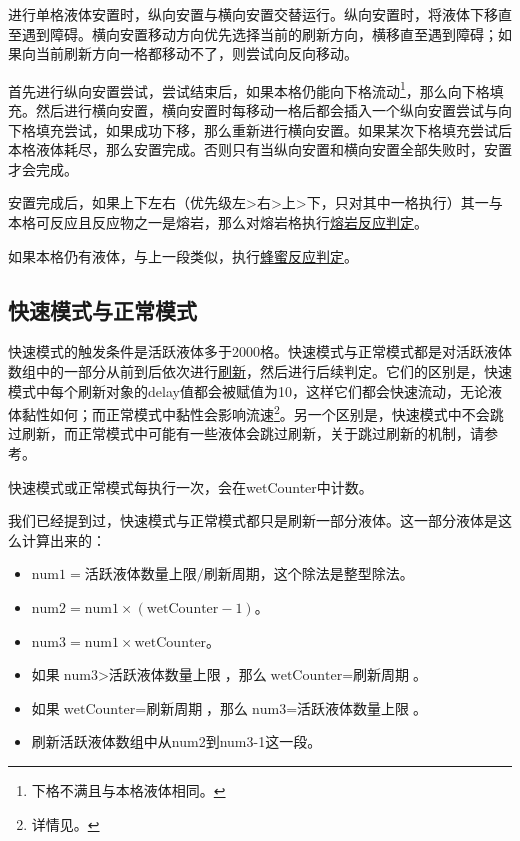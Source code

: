 进行单格液体安置时，纵向安置与横向安置交替运行。纵向安置时，将液体下移直至遇到障碍。横向安置移动方向优先选择当前的刷新方向，横移直至遇到障碍；如果向当前刷新方向一格都移动不了，则尝试向反向移动。

首先进行纵向安置尝试，尝试结束后，如果本格仍能向下格流动\footnote{下格不满且与本格液体相同。}，那么向下格填充。然后进行横向安置，横向安置时每移动一格后都会插入一个纵向安置尝试与向下格填充尝试，如果成功下移，那么重新进行横向安置。如果某次下格填充尝试后本格液体耗尽，那么安置完成。否则只有当纵向安置和横向安置全部失败时，安置才会完成。

安置完成后，如果上下左右（优先级左>右>上>下，只对其中一格执行）其一与本格可反应且反应物之一是熔岩，那么对熔岩格执行\hyperref[app24]{熔岩反应判定}。

如果本格仍有液体，与上一段类似，执行\hyperref[app25]{蜂蜜反应判定}。

\subsection{快速模式与正常模式}\label{app27}
快速模式的触发条件是活跃液体多于2000格。快速模式与正常模式都是对活跃液体数组中的一部分从前到后依次进行\hyperref[app26]{刷新}，然后进行后续判定。它们的区别是，快速模式中每个刷新对象的delay值都会被赋值为10，这样它们都会快速流动，无论液体黏性如何；而正常模式中黏性会影响流速\footnote{详情见。}。另一个区别是，快速模式中不会跳过刷新，而正常模式中可能有一些液体会跳过刷新，关于跳过刷新的机制，请参考。

快速模式或正常模式每执行一次，会在wetCounter中计数。

我们已经提到过，快速模式与正常模式都只是刷新一部分液体。这一部分液体是这么计算出来的：
\begin{itemize}
    \item $\textrm{num1}=\textrm{活跃液体数量上限}/\textrm{刷新周期}$，这个除法是整型除法。
    \item $\textrm{num2}=\textrm{num1}\times(\textrm{wetCounter}-1)$。
    \item $\textrm{num3}=\textrm{num1}\times\textrm{wetCounter}$。
    \item 如果$\textrm{num3}>\textrm{活跃液体数量上限}$，那么$\textrm{wetCounter}=\textrm{刷新周期}$。
    \item 如果$\textrm{wetCounter}=\textrm{刷新周期}$，那么$\textrm{num3}=\textrm{活跃液体数量上限}$。
    \item 刷新活跃液体数组中从num2到num3-1这一段。
\end{itemize}

